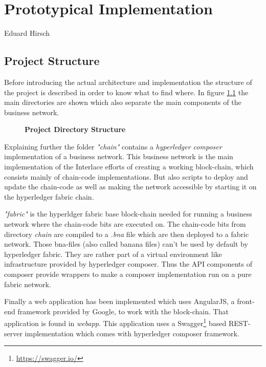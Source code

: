 \chapter{Prototypical Implementation}
\label{ch:prototype}

\vspace{-1cm}
\begin{center}
Eduard Hirsch
\end{center}

\section{Project Structure}
\label{sec:project-structure}

Before introducing the actual architecture and implementation the structure of the project is described in order to know what to find where. In figure \ref{fig:directory-structure} the main directories are shown which also separate the main components of the business network.

\begin{figure}[htbp]
\centering
\begin{minipage}{5cm}
\end{minipage}
\caption{\bf\small Project Directory Structure}
\label{fig:directory-structure}
\end{figure}

Explaining further the folder \textit{"chain"}  contains a \textit{hyperledger composer} implementation of a business network. This business network is the main implementation of the Interlace efforts of creating a working block-chain, which consists mainly of chain-code implementations. But also scripts to deploy and update the chain-code as well as making the network accessible by starting it on the hyperledger fabric chain. 

\textit{"fabric"} is the hyperldger fabric base block-chain needed for running a business network where the chain-code bits are executed on. The chain-code bits from directory \textit{chain} are compiled to a \textit{.bna} file which are then deployed to a fabric network. Those bna-files (also called banana files) can't be used by default by hyperledger fabric. They are rather part of a virtual environment like infrastructure provided by hyperledger composer. Thus the API components of composer provide wrappers to make a composer implementation run on a pure fabric network.

Finally a web application has been implemented which uses AngularJS, a front-end framework provided by Google,  to work with the block-chain. That application is found in \textit{webapp}. This application uses a Swagger\footnote{\url{https://swagger.io/}} based REST-server implementation which comes with hyperledger composer framework.

